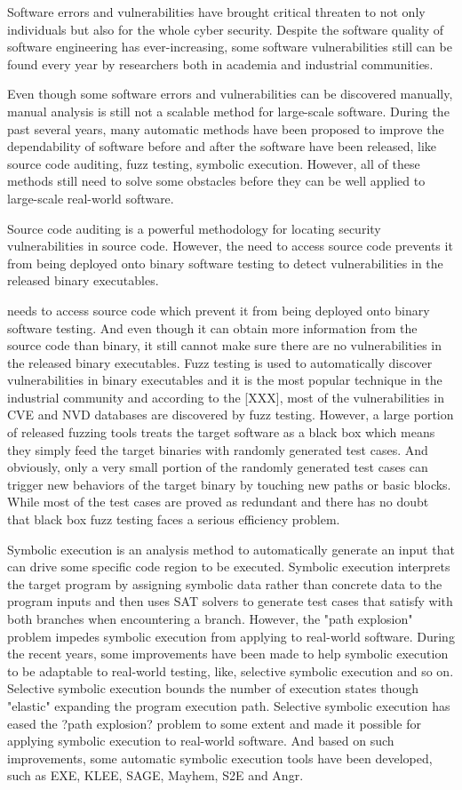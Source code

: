 Software errors and vulnerabilities have brought critical threaten to not only individuals but also for the whole cyber security. Despite the software quality of software engineering has ever-increasing, some software vulnerabilities still can be found every year by researchers both in academia and industrial communities. 

Even though some software errors and vulnerabilities can be discovered manually, manual analysis is still not a scalable method for large-scale software. During the past several years, many automatic methods have been proposed to improve the dependability of software before and after the software have been released, like source code auditing, fuzz testing, symbolic execution. However, all of these methods still need to solve some obstacles before they can be well applied to large-scale real-world software.

Source code auditing is a powerful methodology for locating security vulnerabilities in source code. However, the need to access source code prevents it from being deployed onto binary software testing to detect vulnerabilities in the released binary executables. 
  
 needs to access source code which prevent it from being deployed onto binary software testing. And even though it can obtain more information from the source code than binary, it still cannot make sure there are no vulnerabilities in the released binary executables. Fuzz testing is used to automatically discover vulnerabilities in binary executables and it is the most popular technique in the industrial community and according to the [XXX], most of the vulnerabilities in CVE and NVD databases are discovered by fuzz testing. However, a large portion of released fuzzing tools treats the target software as a black box which means they simply feed the target binaries with randomly generated test cases. And obviously, only a very small portion of the randomly generated test cases can trigger new behaviors of the target binary by touching new paths or basic blocks. While most of the test cases are proved as redundant and there has no doubt that black box fuzz testing faces a serious efficiency problem.

Symbolic execution is an analysis method to automatically generate an input that can drive some specific code region to be executed. Symbolic execution interprets the target program by assigning symbolic data rather than concrete data to the program inputs and then uses SAT solvers to generate test cases that satisfy with both branches when encountering a branch. However, the "path explosion" problem impedes symbolic execution from applying to real-world software. During the recent years, some improvements have been made to help symbolic execution to be adaptable to real-world testing, like, selective symbolic execution and so on. Selective symbolic execution bounds the number of execution states though "elastic" expanding the program execution path. Selective symbolic execution has eased the ?path explosion? problem to some extent and made it possible for applying symbolic execution to real-world software. And based on such improvements, some automatic symbolic execution tools have been developed, such as EXE, KLEE, SAGE, Mayhem, S2E and Angr. 

